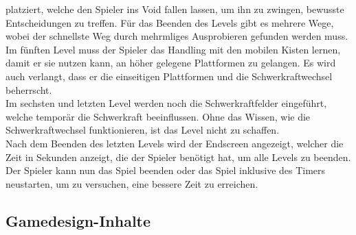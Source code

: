 \documentclass{article}
\begin{document}
platziert, welche den Spieler ins Void fallen lassen, um ihn zu zwingen, bewusste Entscheidungen zu treffen. Für das Beenden des Levels gibt es mehrere Wege, wobei der schnellste Weg
durch mehrmliges Ausprobieren gefunden werden muss.
\\
Im fünften Level muss der Spieler das Handling mit den mobilen Kisten lernen, damit er sie nutzen kann, an höher gelegene Plattformen zu gelangen. Es wird auch verlangt, dass er die einseitigen
Plattformen und die Schwerkraftwechsel beherrscht.
\\
Im sechsten und letzten Level werden noch die Schwerkraftfelder eingeführt, welche temporär die Schwerkraft beeinflussen. Ohne das Wissen, wie die Schwerkraftwechsel funktionieren, ist das
Level nicht zu schaffen.
\\
Nach dem Beenden des letzten Levels wird der Endscreen angezeigt, welcher die Zeit in Sekunden anzeigt, die der Spieler benötigt hat, um alle Levels zu beenden. Der Spieler kann nun das Spiel beenden
oder das Spiel inklusive des Timers neustarten, um zu versuchen, eine bessere Zeit zu erreichen.

\subsection{Gamedesign-Inhalte}
\end{document}
